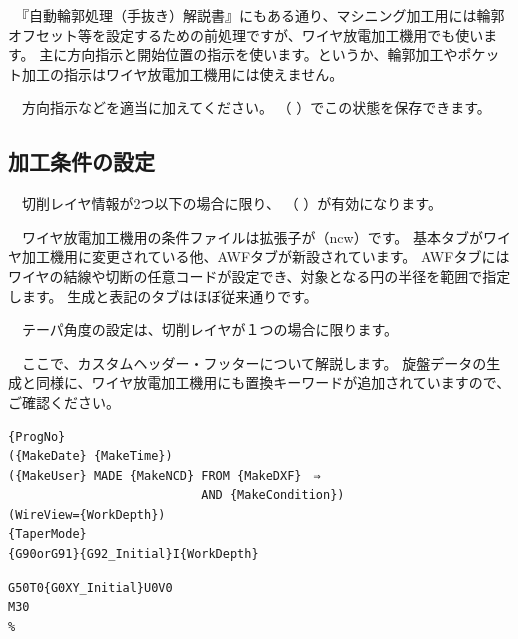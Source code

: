 　『自動輪郭処理（手抜き）解説書』にもある通り、マシニング加工用には輪郭オフセット等を設定するための前処理ですが、ワイヤ放電加工機用でも使います。
主に方向指示と開始位置の指示を使います。というか、輪郭加工やポケット加工の指示はワイヤ放電加工機用には使えません。


　方向指示などを適当に加えてください。
（\,\,）でこの状態を保存できます。

\subsection{加工条件の設定}
　切削レイヤ情報が2つ以下の場合に限り、
（\,\,）が有効になります。

\begin{minipage}[t]{0.4\textwidth}
　ワイヤ放電加工機用の条件ファイルは拡張子が（ncw）です。
基本タブがワイヤ加工機用に変更されている他、AWFタブが新設されています。
AWFタブにはワイヤの結線や切断の任意コードが設定でき、対象となる円の半径を範囲で指定します。
生成と表記のタブはほぼ従来通りです。

　テーパ角度の設定は、切削レイヤが１つの場合に限ります。
\end{minipage}
\begin{minipage}[t]{0.6\textwidth}
\end{minipage}

\vspace*{1zh}
　ここで、カスタムヘッダー・フッターについて解説します。
旋盤データの生成と同様に、ワイヤ放電加工機用にも置換キーワードが追加されていますので、ご確認ください。

\begin{minipage}[t]{0.6\textwidth}
\begin{lstlisting}[caption=Header.txt,numbers=none,label=lst:header.txt]
%
{ProgNo}
({MakeDate} {MakeTime})
({MakeUser} MADE {MakeNCD} FROM {MakeDXF}　⇒
                           AND {MakeCondition})
(WireView={WorkDepth})
{TaperMode}
{G90orG91}{G92_Initial}I{WorkDepth}
\end{lstlisting}
\end{minipage}
\begin{minipage}[t]{0.4\textwidth}
\begin{lstlisting}[caption=Footer.txt,numbers=none,label=lst:footer.txt]
G50T0{G0XY_Initial}U0V0
M30
%
\end{lstlisting}
\end{minipage}

